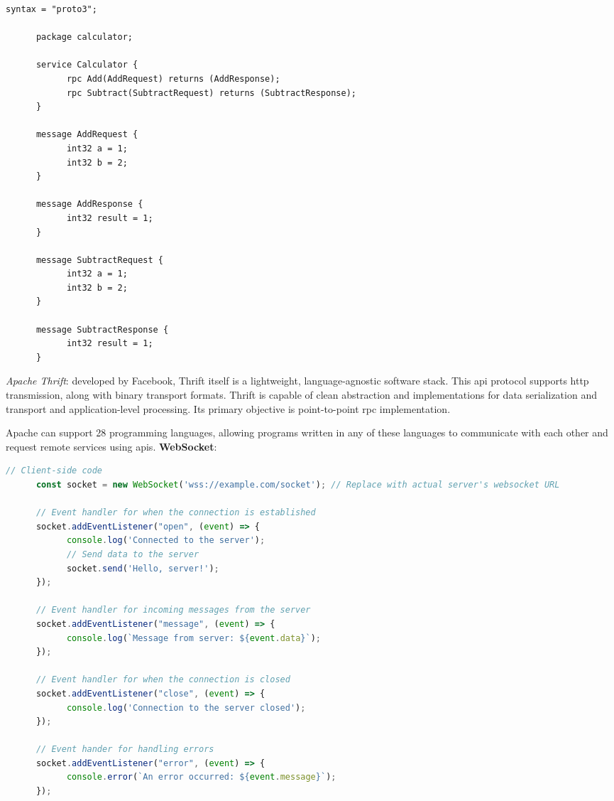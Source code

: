 \begin{lstlisting}[caption=gRPC Service For a Calculator In a Protobuf File]
      syntax = "proto3";

      package calculator;

      service Calculator {
            rpc Add(AddRequest) returns (AddResponse);
            rpc Subtract(SubtractRequest) returns (SubtractResponse);
      }

      message AddRequest {
            int32 a = 1;
            int32 b = 2;
      }

      message AddResponse {
            int32 result = 1;
      }

      message SubtractRequest {
            int32 a = 1;
            int32 b = 2;
      }

      message SubtractResponse {
            int32 result = 1;
      }
\end{lstlisting}

\begin{multicols}{2}
      \textit{Apache Thrift}: developed by Facebook, Thrift itself is a lightweight, language-agnostic software stack.
      This \acrshort{api} protocol supports \acrshort{http} transmission, along with binary transport formats. Thrift
      is capable of clean abstraction and implementations for data serialization and transport and application-level
      processing. Its primary objective is point-to-point \acrshort{rpc} implementation.

      Apache can support 28 programming languages, allowing programs written in any of these languages to communicate
      with each other and request remote services using \acrshort{api}s.
      \textbf{WebSocket}:
\end{multicols}

\begin{lstlisting}[language=JavaScript, caption=WebSocket's Example]
      // Client-side code
      const socket = new WebSocket('wss://example.com/socket'); // Replace with actual server's websocket URL
      
      // Event handler for when the connection is established
      socket.addEventListener("open", (event) => {
            console.log('Connected to the server');
            // Send data to the server
            socket.send('Hello, server!');
      });

      // Event handler for incoming messages from the server
      socket.addEventListener("message", (event) => {
            console.log(`Message from server: ${event.data}`);	
      });

      // Event handler for when the connection is closed
      socket.addEventListener("close", (event) => {
            console.log('Connection to the server closed');
      });

      // Event hander for handling errors
      socket.addEventListener("error", (event) => {
            console.error(`An error occurred: ${event.message}`);
      });
\end{lstlisting}

